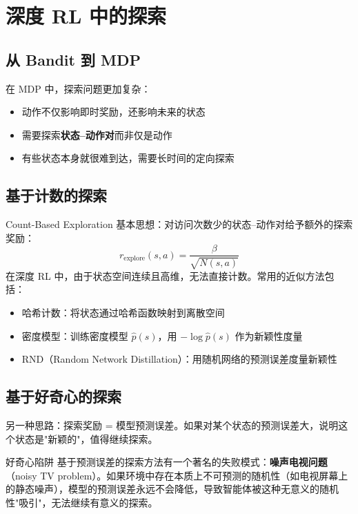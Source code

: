 \section{深度 RL 中的探索}

\subsection{从 Bandit 到 MDP}

在 MDP 中，探索问题更加复杂：
\begin{itemize}
    \item 动作不仅影响即时奖励，还影响未来的状态
    \item 需要探索\textbf{状态--动作对}而非仅是动作
    \item 有些状态本身就很难到达，需要长时间的定向探索
\end{itemize}

\subsection{基于计数的探索}

\begin{importantbox}{Count-Based Exploration}
基本思想：对访问次数少的状态--动作对给予额外的探索奖励：
$$r_{\text{explore}}(s, a) = \frac{\beta}{\sqrt{N(s, a)}}$$
在深度 RL 中，由于状态空间连续且高维，无法直接计数。常用的近似方法包括：
\begin{itemize}
    \item 哈希计数：将状态通过哈希函数映射到离散空间
    \item 密度模型：训练密度模型 $\hat{p}(s)$，用 $-\log \hat{p}(s)$ 作为新颖性度量
    \item RND（Random Network Distillation）：用随机网络的预测误差度量新颖性
\end{itemize}
\end{importantbox}

\subsection{基于好奇心的探索}

另一种思路：探索奖励 = 模型预测误差。如果对某个状态的预测误差大，说明这个状态是"新颖的"，值得继续探索。

\begin{warningbox}{好奇心陷阱}
基于预测误差的探索方法有一个著名的失败模式：\textbf{噪声电视问题}（noisy TV problem）。如果环境中存在本质上不可预测的随机性（如电视屏幕上的静态噪声），模型的预测误差永远不会降低，导致智能体被这种无意义的随机性"吸引"，无法继续有意义的探索。
\end{warningbox}

